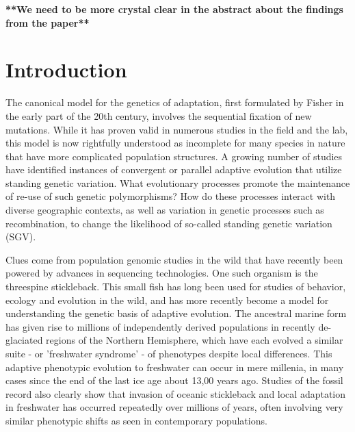 \documentclass{article}
\begin{document}
\textbf{**We need to be more crystal clear in the abstract about the findings from the paper**}


\section{Introduction}

%

The canonical model for the genetics of adaptation, first formulated by Fisher in the early part of the 20th century, involves the sequential fixation of new mutations. While it has proven valid in numerous studies in the field and the lab, this model is now rightfully understood as incomplete for many species in nature that have more complicated population structures. A growing number of studies have identified instances of convergent or parallel adaptive evolution that utilize standing genetic variation. What evolutionary processes promote the maintenance of re-use of such genetic polymorphisms? How do these processes interact with diverse geographic contexts, as well as variation in genetic processes such as recombination, to change the likelihood of so-called standing genetic variation (SGV). 

Clues come from population genomic studies in the wild that have recently been powered by advances in sequencing technologies. One such organism is the threespine stickleback. This small fish has long been used for studies of behavior, ecology and evolution in the wild, and has more recently become a model for understanding the genetic basis of adaptive evolution. The ancestral marine form has given rise to millions of independently derived populations in recently de-glaciated regions of the Northern Hemisphere, which have each evolved a similar suite - or 'freshwater syndrome' - of phenotypes despite local differences. This adaptive phenotypic evolution to freshwater can occur in mere millenia, in many cases since the end of the last ice age about 13,00 years ago. Studies of the fossil record also clearly show that invasion of oceanic stickleback and local adaptation in freshwater has occurred repeatedly over millions of years, often involving very similar phenotypic shifts as seen in contemporary populations.
    
\end{document}
